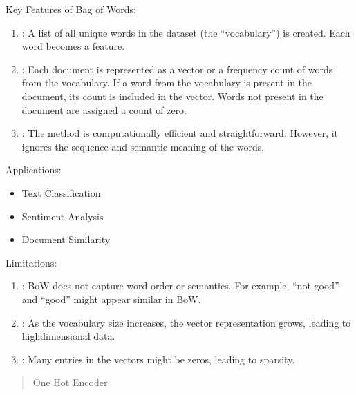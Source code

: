 \documentclass[letterpaper,11pt,english]{sphinxmanual}
\begin{document}
\sphinxAtStartPar
Key Features of Bag of Words:
\begin{enumerate}
%
\item {} 
\sphinxAtStartPar
{}:
\sphinxhyphen{} A list of all unique words in the dataset (the “vocabulary”) is created.
\sphinxhyphen{} Each word becomes a feature.

\item {} 
\sphinxAtStartPar
{}:
\sphinxhyphen{} Each document is represented as a vector or a frequency count of words from the vocabulary.
\sphinxhyphen{} If a word from the vocabulary is present in the document, its count is included in the vector.
\sphinxhyphen{} Words not present in the document are assigned a count of zero.

\item {} 
\sphinxAtStartPar
{}:
\sphinxhyphen{} The method is computationally efficient and straightforward.
\sphinxhyphen{} However, it ignores the sequence and semantic meaning of the words.

\end{enumerate}

\sphinxAtStartPar
Applications:
\begin{itemize}
\item {} 
\sphinxAtStartPar
Text Classification

\item {} 
\sphinxAtStartPar
Sentiment Analysis

\item {} 
\sphinxAtStartPar
Document Similarity

\end{itemize}

\sphinxAtStartPar
Limitations:
\begin{enumerate}
%
\item {} 
\sphinxAtStartPar
{}:
\sphinxhyphen{} BoW does not capture word order or semantics.
\sphinxhyphen{} For example, “not good” and “good” might appear similar in BoW.

\item {} 
\sphinxAtStartPar
{}:
\sphinxhyphen{} As the vocabulary size increases, the vector representation grows, leading to high\sphinxhyphen{}dimensional data.

\item {} 
\sphinxAtStartPar
{}:
\sphinxhyphen{} Many entries in the vectors might be zeros, leading to sparsity.

\end{enumerate}
\begin{quote}

\sphinxAtStartPar
One Hot Encoder
\end{quote}
\end{document}
